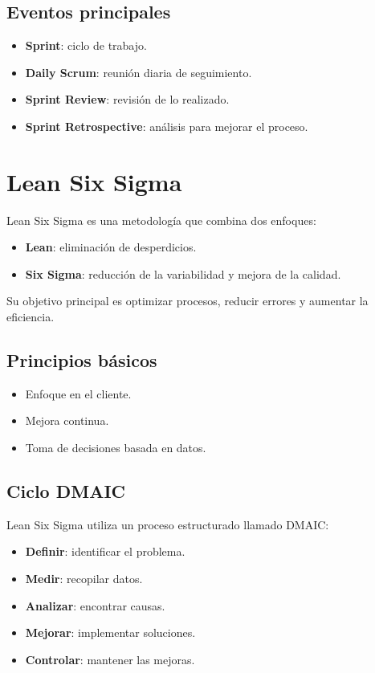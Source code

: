 \documentclass[a4paper,12pt]{article}
\begin{document}
\subsection{Eventos principales}
\begin{itemize}
    \item \textbf{Sprint}: ciclo de trabajo.
    \item \textbf{Daily Scrum}: reunión diaria de seguimiento.
    \item \textbf{Sprint Review}: revisión de lo realizado.
    \item \textbf{Sprint Retrospective}: análisis para mejorar el proceso.
\end{itemize}

\section{Lean Six Sigma}
Lean Six Sigma es una metodología que combina dos enfoques:
\begin{itemize}
    \item \textbf{Lean}: eliminación de desperdicios.
    \item \textbf{Six Sigma}: reducción de la variabilidad y mejora de la calidad.
\end{itemize}

Su objetivo principal es optimizar procesos, reducir errores y aumentar la eficiencia.

\subsection{Principios básicos}
\begin{itemize}
    \item Enfoque en el cliente.
    \item Mejora continua.
    \item Toma de decisiones basada en datos.
\end{itemize}

\subsection{Ciclo DMAIC}
Lean Six Sigma utiliza un proceso estructurado llamado DMAIC:
\begin{itemize}
    \item \textbf{Definir}: identificar el problema.
    \item \textbf{Medir}: recopilar datos.
    \item \textbf{Analizar}: encontrar causas.
    \item \textbf{Mejorar}: implementar soluciones.
    \item \textbf{Controlar}: mantener las mejoras.
\end{itemize}
\end{document}
